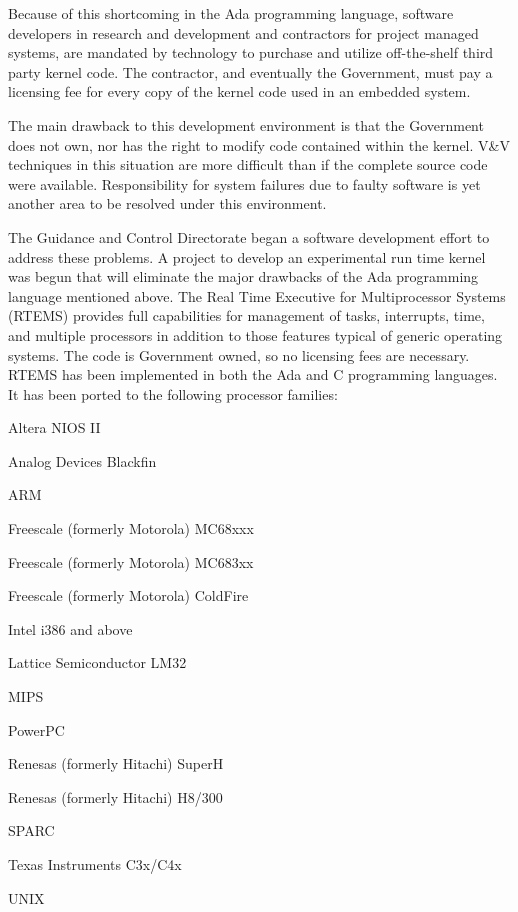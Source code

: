 Because of this shortcoming in the Ada programming language, software developers in research and development and contractors for project managed systems, are mandated by technology to purchase and utilize off-\/the-\/shelf third party kernel code. The contractor, and eventually the Government, must pay a licensing fee for every copy of the kernel code used in an embedded system.

The main drawback to this development environment is that the Government does not own, nor has the right to modify code contained within the kernel. V\&V techniques in this situation are more difficult than if the complete source code were available. Responsibility for system failures due to faulty software is yet another area to be resolved under this environment.

The Guidance and Control Directorate began a software development effort to address these problems. A project to develop an experimental run time kernel was begun that will eliminate the major drawbacks of the Ada programming language mentioned above. The Real Time Executive for Multiprocessor Systems (R\+T\+E\+MS) provides full capabilities for management of tasks, interrupts, time, and multiple processors in addition to those features typical of generic operating systems. The code is Government owned, so no licensing fees are necessary. R\+T\+E\+MS has been implemented in both the Ada and C programming languages. It has been ported to the following processor families\+:


\begin{DoxyItemize}
\item Altera N\+I\+OS II
\item Analog Devices Blackfin
\item A\+RM
\item Freescale (formerly Motorola) M\+C68xxx
\item Freescale (formerly Motorola) M\+C683xx
\item Freescale (formerly Motorola) Cold\+Fire
\item Intel i386 and above
\item Lattice Semiconductor L\+M32
\item M\+I\+PS
\item Power\+PC
\item Renesas (formerly Hitachi) SuperH
\item Renesas (formerly Hitachi) H8/300
\item S\+P\+A\+RC
\item Texas Instruments C3x/\+C4x
\item U\+N\+IX
\end{DoxyItemize}

